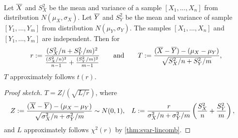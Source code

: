 \documentclass[a4paper, 12pt, fleqn]{article}
\begin{document}
\begin{theorem}
Let $\overline{X}$ and $S_X^2$ be the mean and variance of a sample $[X_1, \ldots, X_n]$
from distribution $N(\mu_X, \sigma_X)$.
Let $\overline{Y}$ and $S_Y^2$ be the mean and variance of sample $[Y_1, \ldots, Y_m]$
from distribution $N(\mu_Y, \sigma_Y)$.
The samples $[X_1, \ldots, X_n]$ and $[Y_1, \ldots, Y_m]$ are independent.
Then for
\[ r := \frac{(S_X^2/n + S_Y^2/m)^2}{\frac{(S_X^2/n)^2}{n-1} + \frac{(S_Y^2/m)^2}{m-1}}
\qquad\textrm{and}\qquad T := \frac{(\overline{X}-\overline{Y}) - (\mu_X-\mu_Y)}{\sqrt{S_X^2/n + S_Y^2/m}}, \]
$T$ approximately follows $t(r)$.
\end{theorem}
\begin{proof}[Proof sketch]
$T = Z/(\sqrt{L/r})$, where
\begin{align*}
Z &:= \frac{(\overline{X}-\overline{Y}) - (\mu_X-\mu_Y)}{\sqrt{\sigma_X^2/n + \sigma_Y^2/m}} \sim N(0, 1),
& L &:= \frac{r}{\sigma_X^2/n + \sigma_Y^2/m}\left(\frac{S_X^2}{n} + \frac{S_Y^2}{m}\right),
\end{align*}
and $L$ approximately follows $\chi^2(r)$ by \cref{thm:svar-lincomb}.
\end{proof}



\end{document}
